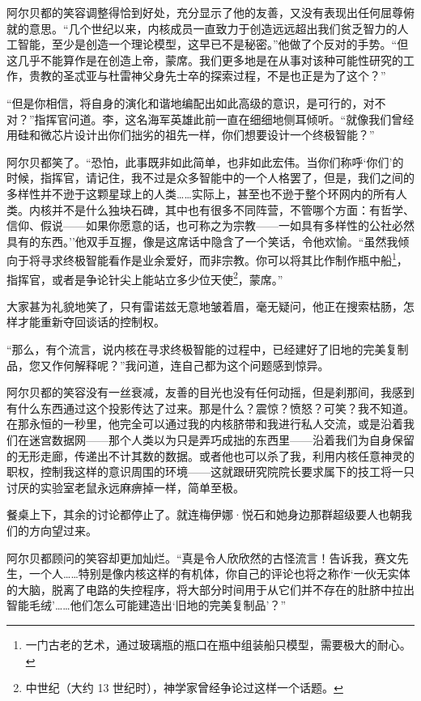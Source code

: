 \documentclass[AutoFakeBold=true]{book}
\begin{document}
阿尔贝都的笑容调整得恰到好处，充分显示了他的友善，又没有表现出任何屈尊俯就的意思。``几个世纪以来，内核成员一直致力于创造远远超出我们贫乏智力的人工智能，至少是创造一个理论模型，这早已不是秘密。''他做了个反对的手势。``但这几乎不能算作是在创造上帝，蒙席。我们更多地是在从事对该种可能性研究的工作，贵教的圣忒亚与杜雷神父身先士卒的探索过程，不是也正是为了这个？''

``但是你相信，将自身的演化和谐地编配出如此高级的意识，是可行的，对不对？''指挥官问道。李，这名海军英雄此前一直在细细地侧耳倾听。``就像我们曾经用硅和微芯片设计出你们拙劣的祖先一样，你们想要设计一个终极智能？''

阿尔贝都笑了。``恐怕，此事既非如此简单，也非如此宏伟。当你们称呼`你们'的时候，指挥官，请记住，我不过是众多智能中的一个人格罢了，但是，我们之间的多样性并不逊于这颗星球上的人类……实际上，甚至也不逊于整个环网内的所有人类。内核并不是什么独块石碑，其中也有很多不同阵营，不管哪个方面：有哲学、信仰、假说——如果你愿意的话，也可称之为{\kaishu 宗教}——一如具有多样性的公社必然具有的东西。''他双手互握，像是这席话中隐含了一个笑话，令他欢愉。``虽然我倾向于将寻求终极智能看作是业余爱好，而非宗教。你可以将其比作制作瓶中船\footnote{一门古老的艺术，通过玻璃瓶的瓶口在瓶中组装船只模型，需要极大的耐心。}，指挥官，或者是争论针尖上能站立多少位天使\footnote{中世纪（大约 13 世纪时），神学家曾经争论过这样一个话题。}，蒙席。''

大家甚为礼貌地笑了，只有雷诺兹无意地皱着眉，毫无疑问，他正在搜索枯肠，怎样才能重新夺回谈话的控制权。

``那么，有个流言，说内核在寻求终极智能的过程中，已经建好了旧地的完美复制品，您又作何解释呢？''我问道，连自己都为这个问题感到惊异。

阿尔贝都的笑容没有一丝衰减，友善的目光也没有任何动摇，但是刹那间，我感到有{\kaishu 什么东西}通过这个投影传达了过来。那是什么？震惊？愤怒？可笑？我不知道。在那永恒的一秒里，他完全可以通过我的内核脐带和我进行私人交流，或是沿着我们在迷宫数据网——那个人类以为只是弄巧成拙的东西里——沿着我们为自身保留的无形走廊，传递出不计其数的数据。或者他也可以杀了我，利用内核任意神灵的职权，控制我这样的意识周围的环境——这就跟研究院院长要求属下的技工将一只讨厌的实验室老鼠永远麻痹掉一样，简单至极。

餐桌上下，其余的讨论都停止了。就连梅伊娜·悦石和她身边那群超级要人也朝我们的方向望过来。

阿尔贝都顾问的笑容却更加灿烂。``真是令人欣欣然的古怪流言！告诉我，赛文先生，一个人……特别是像内核这样的有机体，你自己的评论也将之称作`一伙无实体的大脑，脱离了电路的失控程序，将大部分时间用于从它们并不存在的肚脐中拉出智能毛绒'……他们怎么可能建造出`旧地的完美复制品'？''
\end{document}
